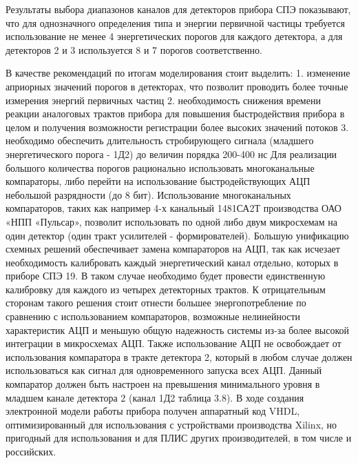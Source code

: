 Результаты выбора диапазонов каналов для детекторов прибора СПЭ показывают, что для однозначного определения типа и энергии первичной частицы требуется использование не менее 4 энергетических порогов для каждого детектора, а для детекторов 2 и 3 используется 8 и 7 порогов соответственно. 

В качестве рекомендаций по итогам моделирования стоит выделить:
1.	изменение априорных значений порогов в детекторах, что позволит проводить более точные измерения энергий первичных частиц 
2.	необходимость снижения времени реакции аналоговых трактов прибора для повышения быстродействия прибора в целом и получения возможности регистрации более высоких значений потоков
3.	необходимо обеспечить длительность стробирующего сигнала (младшего энергетического порога - 1Д2) до величин порядка 200-400 нс
Для реализации большого количества порогов рационально использовать многоканальные компараторы, либо перейти на использование быстродействующих АЦП небольшой разрядности (до 8 бит). Использование многоканальных компараторов, таких как например 4-х канальный 1481СА2Т производства ОАО «НПП «Пульсар», позволит использовать по одной либо двум микросхемам на один детектор (один тракт усилителей - формирователей). Большую унификацию схемных решений обеспечивает замена компараторов на АЦП, так как исчезает необходимость калибровать каждый энергетический канал отдельно, которых в приборе СПЭ 19. В таком случае необходимо будет провести единственную калибровку для каждого из четырех детекторных трактов. К отрицательным сторонам такого решения стоит отнести большее энергопотребление по сравнению с использованием компараторов, возможные нелинейности характеристик АЦП и меньшую общую надежность системы из-за более высокой интеграции в микросхемах АЦП. Также использование АЦП не освобождает от использования компаратора в тракте детектора 2, который в любом случае должен использоваться как сигнал для одновременного запуска всех АЦП. Данный компаратор должен быть настроен на превышения минимального уровня в младшем канале детектора 2 (канал 1Д2 таблица 3.8).
В ходе создания электронной модели работы прибора получен аппаратный код VHDL, оптимизированный для использования с устройствами производства Xilinx, но пригодный для использования и для ПЛИС других производителей, в том числе и российских.


